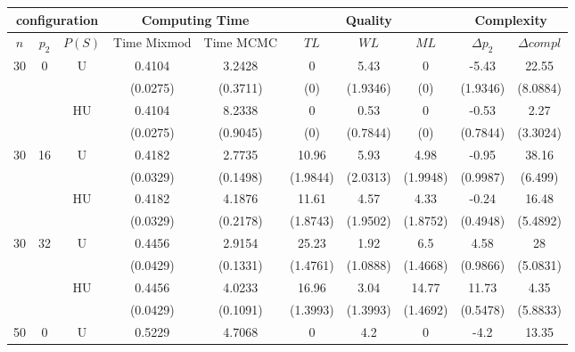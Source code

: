 \documentclass[11pt,a4paper]{article}
\begin{document}
\begin{table}[h!]
\centering
\begin{tabular}{|c|c|c|c|c|c|c|c|c|c|}
\hline
\multicolumn{3}{|c}{configuration}  &  \multicolumn{2}{|c}{Computing Time}  & \multicolumn{3}{|c}{Quality} & \multicolumn{2}{|c|}{Complexity}\\
\hline
$n$ & $p_2$ & $P(S)$ &  Time Mixmod  & Time MCMC  & $TL$ & $WL$ & $ML$ & $\Delta p_2$ & $\Delta compl$ \\
\hline %
30 & 0 & U&0.4104 & 3.2428 & 0 & 5.43 & 0 & -5.43 & 22.55  \\
& & & (0.0275) & (0.3711) & (0) & (1.9346) & (0) & (1.9346) & (8.0884) \\
 &  &HU &0.4104 & 8.2338 & 0 & 0.53 & 0 & -0.53 & 2.27  \\
& & & (0.0275) & (0.9045) & (0) & (0.7844) & (0) & (0.7844) & (3.3024) \\
\hline %
30 & 16 & U&0.4182 & 2.7735 & 10.96 & 5.93 & 4.98 & -0.95 & 38.16  \\
& & & (0.0329) & (0.1498) & (1.9844) & (2.0313) & (1.9948) & (0.9987) & (6.499) \\
 &  &HU &0.4182 & 4.1876 & 11.61 & 4.57 & 4.33 & -0.24 & 16.48  \\
& & & (0.0329) & (0.2178) & (1.8743) & (1.9502) & (1.8752) & (0.4948) & (5.4892) \\
\hline %
30 & 32 & U & 0.4456 & 2.9154 & 25.23 & 1.92 & 6.5 & 4.58 & 28  \\
& & & (0.0429) & (0.1331) & (1.4761) & (1.0888) & (1.4668) & (0.9866) & (5.0831) \\
 &  & HU & 0.4456 & 4.0233 & 16.96 & 3.04 & 14.77 & 11.73 & 4.35  \\
& & & (0.0429) & (0.1091) & (1.3993) & (1.3993) & (1.4692) & (0.5478) & (5.8833) \\
\hline
\hline %
50 & 0 & U&0.5229 & 4.7068 & 0 & 4.2 & 0 & -4.2 & 13.35  \\

\end{tabular}
\end{table}
\end{document}
